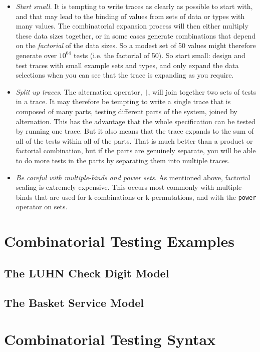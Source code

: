 \documentclass{overturerepchap}
\begin{document}
\begin{itemize}
  \item \emph{Start small}. It is tempting to write traces as clearly as
  possible to start with, and that may lead to the binding of values from sets
  of data or types with many values. The combinatorial expansion process will
  then either multiply these data sizes together, or in some cases generate 
  combinations that depend on the \emph{factorial} of the data sizes. So a
  modest set of 50 values might therefore generate over $10^{64}$ tests (i.e.
  the factorial of 50). So start small: design and test traces with small
  example sets and types, and only expand the data selections when you can see
  that the trace is expanding as you require.
  \item \emph{Split up traces}. The alternation operator, \texttt{|}, will join
  together two sets of tests in a trace. It may therefore be tempting to write a
  single trace that is composed of many parts, testing different parts of the
  system, joined by alternation. This has the advantage that the whole
  specification can be tested by running one trace. But it also means that the
  trace expands to the sum of all of the tests within all of the parts. That is
  much better than a product or factorial combination, but if the parts are
  genuinely separate, you will be able to do more tests in the parts by
  separating them into multiple traces.
  \item \emph{Be careful with multiple-binds and power sets}. As mentioned
  above, factorial scaling is extremely expensive. This occurs most commonly
  with multiple-binds that are used for k-combinations or k-permutations, and
  with the \texttt{power} operator on sets.
\end{itemize}

\chapter{Combinatorial Testing Examples}
\label{chap:examples}

\section{The LUHN Check Digit Model}
\section{The Basket Service Model}

\appendix
\chapter{Combinatorial Testing Syntax}
\label{chap:CTsyntax}
\end{document}
